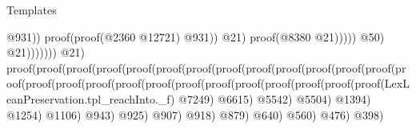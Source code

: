 \begin{lexlean}{Templates}
\begin{coremodule}
                                                                                              @931))
                                                                                        proof(proof(@2360
                                                                                              @12721)
                                                                                            @931))
                                                                                      @21)
                                                                                    proof(@8380
                                                                                        @21)))))
                                                                          @50)
                                                                        @21)))))))
                                                  @21)
                                                proof(proof(proof(proof(proof(proof(proof(proof(proof(proof(proof(proof(proof(proof(proof(proof(proof(proof(proof(proof(proof(proof(proof(proof(proof(proof(LexLeanPreservation.tpl_reachInto._f)
                                                                                                    @7249)
                                                                                                  @6615)
                                                                                                @5542)
                                                                                              @5504)
                                                                                            @1394)
                                                                                          @1254)
                                                                                        @1106)
                                                                                      @943)
                                                                                    @925)
                                                                                  @907)
                                                                                @918)
                                                                              @879)
                                                                            @640)
                                                                          @560)
                                                                        @476)
                                                                      @398)

\end{coremodule}
\end{lexlean}
